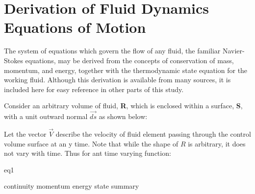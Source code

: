 \section{Derivation of Fluid Dynamics Equations of Motion}

The  system of equations which govern the flow of any fluid, the familiar
Navier-Stokes equations, may be derived from the concepts of conservation of
mass, momentum, and energy, together with the thermodynamic state equation for
the working fluid. Although this derivation is available from many sources, it
is included here for easy reference in other parts of this study. \cite{durand4}

Consider an arbitrary volume of fluid, {\bf R}, which is enclosed within a
surface, {\bf S}, with a unit outward normal {$\overrightarrow{ds}$} as shown
below:


Let the vector {$\overrightarrow{V}$} describe the velocity of fluid element
passing through the control volume surface at an y time. Note that while the
shape of $R$ is arbitrary, it does not vary with time. Thus for ant time
varying function:

{eq1}

{continuity}
{momentum}
{energy}
{state}
{summary}


